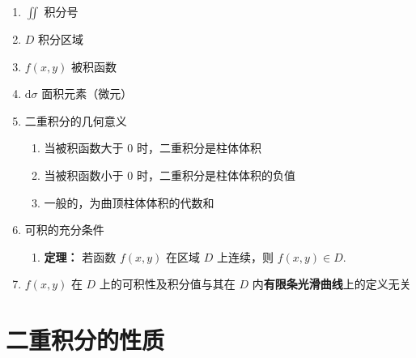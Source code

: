 \documentclass[lang = zh , final , oneside , openany , titlepage , zihao = -4 , linespread = 1.3 , baselineskip = false , cjk-font = windows , text-font = newtx , math-font = newtx , math-style = ISO , uppercase-greek = upright , integral-limits = false]{sjtureport}
\begin{document}
\begin{enumerate}
\item
  \(\displaystyle \iint\) 积分号
\item
  \(D\) 积分区域
\item
  \(f(x,y)\) 被积函数
\item
  \(\mathrm{d}\sigma\) 面积元素（微元）
\item
  二重积分的几何意义

  \begin{enumerate}
  \item
    当被积函数大于 \(0\) 时，二重积分是柱体体积
  \item
    当被积函数小于 \(0\) 时，二重积分是柱体体积的负值
  \item
    一般的，为曲顶柱体体积的代数和
  \end{enumerate}
\item
  可积的充分条件

  \begin{enumerate}
  \item
    \textbf{定理：} 若函数 \(f(x,y)\) 在区域 \(D\) 上连续，则
    \(f(x,y)\in D\).
  \end{enumerate}
\item
  \(f(x,y)\) 在 \(D\) 上的可积性及积分值与其在 \(D\)
  内\textbf{有限条光滑曲线}上的定义无关
\end{enumerate}

\section{二重积分的性质}
\end{document}
